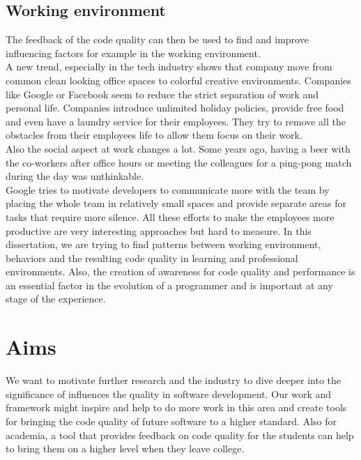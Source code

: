 \subsection{Working environment}
The feedback of the code quality can then be used to find and improve influencing factors for example in the working environment.\\
A new trend, especially in the tech industry shows that company move from common clean looking office spaces to colorful creative environments. Companies like Google or Facebook seem to reduce the strict separation of work and personal life. Companies introduce unlimited holiday policies, provide free food and even have a laundry service for their employees. They try to remove all the obstacles from their employees life to allow them focus on their work.\\
Also the social aspect at work changes a lot. Some years ago, having a beer with the co-workers after office hours or meeting the colleagues for a ping-pong match during the day was unthinkable.\\
Google tries to motivate developers to communicate more with the team by placing the whole team in relatively small spaces and provide separate areas for tasks that require more silence. 
All these efforts to make the employees more productive are very interesting approaches but hard to measure. 
\bigbreak
In this dissertation, we are trying to find patterns between working environment, behaviors and the resulting code quality in learning and professional environments. Also, the creation of awareness for code quality and performance is an essential factor in the evolution of a programmer and is important at any stage of the experience. 

\section{Aims}
We want to motivate further research and the industry to dive deeper into the significance of influences the quality in software development. 
Our work and framework might inspire and help to do more work in this area and create tools for bringing the code quality of future software to a higher standard. 
Also for academia, a tool that provides feedback on code quality for the students can help to bring them on a higher level when they leave college. 

